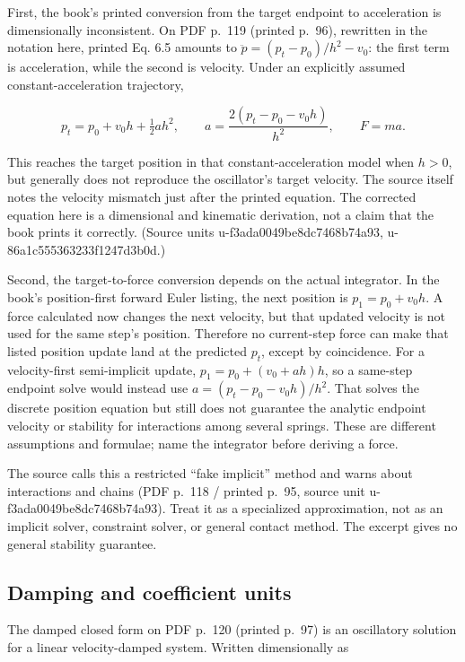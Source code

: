 First, the book's printed conversion from the target endpoint to acceleration is dimensionally inconsistent. On PDF p.~119 (printed p.~96), rewritten in the notation here, printed Eq. 6.5 amounts to \(\ddot p=(p_t-p_0)/h^2-v_0\): the first term is acceleration, while the second is velocity. Under an explicitly assumed constant-acceleration trajectory,

\[
p_t=p_0+v_0h+\tfrac12 ah^2,
\qquad
a=\frac{2(p_t-p_0-v_0h)}{h^2},
\qquad F=ma.
\]

This reaches the target position in that constant-acceleration model when \(h>0\), but generally does not reproduce the oscillator's target velocity. The source itself notes the velocity mismatch just after the printed equation. The corrected equation here is a dimensional and kinematic derivation, not a claim that the book prints it correctly. (Source units u-f3ada0049be8dc7468b74a93, u-86a1c555363233f1247d3b0d.)

Second, the target-to-force conversion depends on the actual integrator. In the book's position-first forward Euler listing, the next position is \(p_1=p_0+v_0h\). A force calculated now changes the next velocity, but that updated velocity is not used for the same step's position. Therefore no current-step force can make that listed position update land at the predicted \(p_t\), except by coincidence. For a velocity-first semi-implicit update, \(p_1=p_0+(v_0+ah)h\), so a same-step endpoint solve would instead use \(a=(p_t-p_0-v_0h)/h^2\). That solves the discrete position equation but still does not guarantee the analytic endpoint velocity or stability for interactions among several springs. These are different assumptions and formulae; name the integrator before deriving a force.

The source calls this a restricted ``fake implicit'' method and warns about interactions and chains (PDF p.~118 / printed p.~95, source unit u-f3ada0049be8dc7468b74a93). Treat it as a specialized approximation, not as an implicit solver, constraint solver, or general contact method. The excerpt gives no general stability guarantee.

\subsection{Damping and coefficient units}\label{06-engine-ii-ch047-damping-and-coefficient-units}

\hypertarget{06-engine-ii-ch047-damping-and-coefficient-units}{}

The damped closed form on PDF p.~120 (printed p.~97) is an oscillatory solution for a linear velocity-damped system. Written dimensionally as

